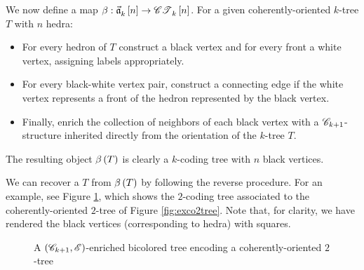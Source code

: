 \documentclass[distribution,draft]{brandiss} %
\numberwithin{section}{chapter}
\numberwithin{figure}{chapter}
\begin{document}
We now define a map $\beta: \vec{\mathfrak{a}}_{k}^{} \left[ {n} \right] \to \mathscr{CT}_{k}^{} \left[ {n} \right]$.
For a given coherently-oriented $k$-tree $T$ with $n$ hedra:
\begin{itemize}
  \item For every hedron of $T$ construct a black vertex and for every front a white vertex, assigning labels appropriately.
  \item For every black-white vertex pair, construct a connecting edge if the white vertex represents a front of the hedron represented by the black vertex.
  \item Finally, enrich the collection of neighbors of each black vertex with a $\mathscr{C}_{k+1}$-structure inherited directly from the orientation of the $k$-tree $T$.
\end{itemize}
The resulting object $\beta \left( {T} \right)$ is clearly a $k$-coding tree with $n$ black vertices.

We can recover a $T$ from $\beta \left( {T} \right)$ by following the reverse procedure.
For an example, see Figure \ref{fig:exbctree}, which shows the $2$-coding tree associated to the coherently-oriented $2$-tree of Figure \ref{fig:exco2tree}.
Note that, for clarity, we have rendered the black vertices (corresponding to hedra) with squares.

\begin{figure}[htb]
  \centering
  \caption{A $\left( {\mathscr{C}_{k+1}, \mathscr{E}} \right)$-enriched bicolored tree encoding a coherently-oriented $2$-tree}
  \label{fig:exbctree}
\end{figure}
\end{document}
